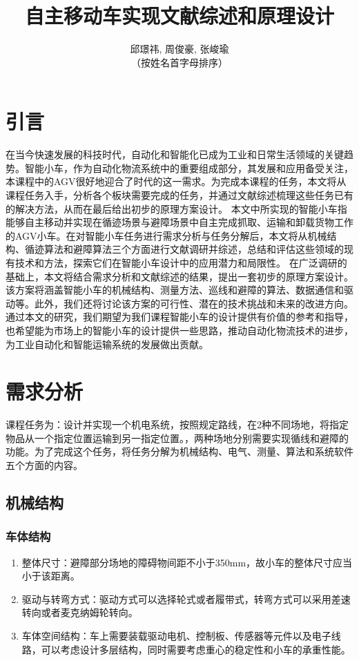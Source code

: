 \documentclass{report}
\title{自主移动车实现文献综述和原理设计}
\author{邱璟祎, 周俊豪, 张峻瑜\\
  （按姓名首字母排序）
}
\begin{document}
\maketitle
\tableofcontents
\newpage
\chapter{引言}
在当今快速发展的科技时代，自动化和智能化已成为工业和日常生活领域的关键趋势。智能小车，作为自动化物流系统中的重要组成部分，其发展和应用备受关注，本课程中的AGV很好地迎合了时代的这一需求。为完成本课程的任务，本文将从课程任务入手，分析各个板块需要完成的任务，并通过文献综述梳理这些任务已有的解决方法，从而在最后给出初步的原理方案设计。
本文中所实现的智能小车指能够自主移动并实现在循迹场景与避障场景中自主完成抓取、运输和卸载货物工作的AGV小车。在对智能小车任务进行需求分析与任务分解后，本文将从机械结构、循迹算法和避障算法三个方面进行文献调研并综述，总结和评估这些领域的现有技术和方法，探索它们在智能小车设计中的应用潜力和局限性。
在广泛调研的基础上，本文将结合需求分析和文献综述的结果，提出一套初步的原理方案设计。该方案将涵盖智能小车的机械结构、测量方法、巡线和避障的算法、数据通信和驱动等。此外，我们还将讨论该方案的可行性、潜在的技术挑战和未来的改进方向。
通过本文的研究，我们期望为我们课程智能小车的设计提供有价值的参考和指导，也希望能为市场上的智能小车的设计提供一些思路，推动自动化物流技术的进步，为工业自动化和智能运输系统的发展做出贡献。


\chapter{需求分析}
课程任务为：设计并实现一个机电系统，按照规定路线，在2种不同场地，将指定物品从一个指定位置运输到另一指定位置。，两种场地分别需要实现循线和避障的功能。为了完成这个任务，将任务分解为机械结构、电气、测量、算法和系统软件五个方面的内容。
\section{机械结构}
\label{sec:label}
\subsection{车体结构}
\label{subsec:label}
\begin{enumerate}
\item 整体尺寸：避障部分场地的障碍物间距不小于350mm，故小车的整体尺寸应当小于该距离。
\item 驱动与转弯方式：驱动方式可以选择轮式或者履带式，转弯方式可以采用差速转向或者麦克纳姆轮转向。
  \item 车体空间结构：车上需要装载驱动电机、控制板、传感器等元件以及电子线路，可以考虑设计多层结构，同时需要考虑重心的稳定性和小车的承重性能。
\end{enumerate}
\end{document}
